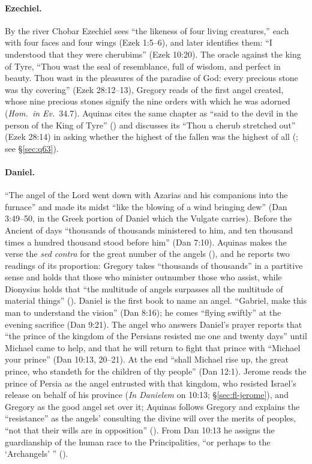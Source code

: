 \paragraph{Ezechiel.} By the river Chobar Ezechiel sees ``the likeness of
four living creatures,'' each with four faces and four wings (Ezek 1:5--6),
and later identifies them: ``I understood that they were cherubims'' (Ezek
10:20). The oracle against the king of
Tyre, ``Thou wast the seal of resemblance, full of wisdom, and perfect in
beauty. Thou wast in the pleasures of the paradise of God: every precious
stone was thy covering'' (Ezek 28:12--13), Gregory reads of the first angel
created, whose nine precious stones signify the nine orders with which he
was adorned (\emph{Hom.\ in Ev.}\ 34.7). Aquinas cites the same chapter as
``said to the devil in the person of the King of Tyre'' () and discusses its ``Thou a cherub stretched out'' (Ezek 28:14) in
asking whether the highest of the fallen was the highest of all (; see \S\ref{sec:q63}).

\paragraph{Daniel.} ``The angel of the Lord went down with Azarias and his
companions into the furnace'' and made its midst ``like the blowing of a
wind bringing dew'' (Dan 3:49--50, in the Greek portion of Daniel which the
Vulgate carries). Before the Ancient of days ``thousands of thousands
ministered to him, and ten thousand times a hundred thousand stood before
him'' (Dan 7:10). Aquinas makes the verse the \emph{sed contra} for the
great number of the angels (), and he reports two readings
of its proportion: Gregory takes ``thousands of thousands'' in a partitive
sense and holds that those who minister outnumber those who assist, while
Dionysius holds that ``the multitude of angels surpasses all the multitude
of material things'' (). Daniel is the first book to
name an angel. ``Gabriel, make this man to understand the vision'' (Dan 8:16); he comes
``flying swiftly'' at the evening sacrifice (Dan 9:21). The angel who
answers Daniel's prayer reports that ``the prince of the kingdom of the
Persians resisted me one and twenty days'' until Michael came to help, and
that he will return to fight that prince with ``Michael your prince''
(Dan 10:13, 20--21). At the end ``shall Michael rise up, the great prince,
who standeth for the children of thy people'' (Dan 12:1). Jerome reads
the prince of Persia as the angel entrusted with that kingdom, who resisted
Israel's release on behalf of his province (\emph{In Danielem} on 10:13;
\S\ref{sec:fl-jerome}), and Gregory as the good angel set over it;
Aquinas follows Gregory and explains the
``resistance'' as the angels' consulting the divine will over the merits
of peoples, ``not that their wills are in opposition'' (). From Dan 10:13 he assigns the guardianship of the human race to
the Principalities, ``or perhaps to the `Archangels' '' ().

